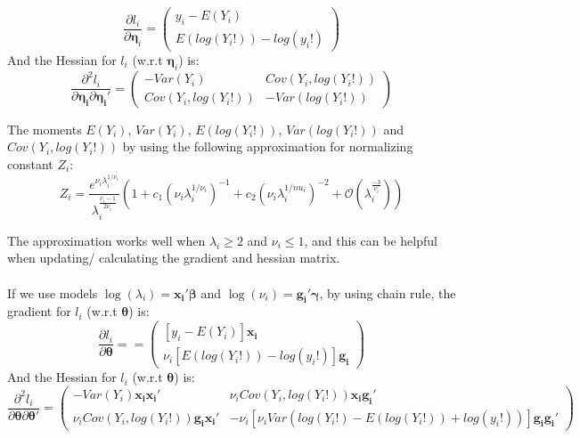 \documentclass[]{article}
\begin{document}
\begin{equation*}
	\frac{\partial l_i}{\partial \boldsymbol{\eta}_i} = 
	\begin{pmatrix} y_i - E(Y_i)\\
		E(log(Y_i!)) - log(y_i!)
	\end{pmatrix}
\end{equation*}
And the Hessian for $l_i$ (w.r.t $\boldsymbol{\eta}_i$) is:
\begin{equation*}
	\frac{\partial^2 l_i}{\partial \boldsymbol{\eta_i}\partial \boldsymbol{\eta_i}'}= 
	\begin{pmatrix} -Var(Y_i) & Cov(Y_i, log(Y_i!))\\
		Cov(Y_i, log(Y_i!)) & -Var(log(Y_i!))
	\end{pmatrix}
\end{equation*}

The moments $E(Y_i)$, $Var(Y_i)$, $E(log(Y_i!))$, $Var(log(Y_i!))$ and $Cov(Y_i, log(Y_i!))$ by using the following approximation for normalizing constant $Z_i$:
\begin{equation*}
	Z_i = \frac{e^{\nu_i \lambda_i^{1/\nu_i}}}{\lambda_i^{\frac{\nu_i-1}{2\nu_i}}}\left(1 + c_1(\nu_i \lambda_i^{1/\nu_i})^{-1} + c_2(\nu_i \lambda_i^{1/nu_i})^{-2} + \mathcal{O}(\lambda_i^{\frac{-3}{\nu_i}})\right)
\end{equation*}

The approximation works well when $\lambda_i \geq 2$ and $\nu_i \leq 1$, and this can be helpful when updating/ calculating the gradient and hessian matrix.\\
\\
If we use models $\log(\lambda_i) = \boldsymbol{x_i}'\boldsymbol{\beta}$ and $\log(\nu_i) = \boldsymbol{g_i}'\boldsymbol{\gamma}$, by using chain rule, the gradient for $l_i$ (w.r.t $\boldsymbol{\theta}$) is:
\begin{equation*}
	\frac{\partial l_i}{\partial \boldsymbol{\theta}} = 
	 = \begin{pmatrix} [y_i - E(Y_i)]\boldsymbol{x_i}\\
		\nu_i[E(log(Y_i!)) - log(y_i!)]\boldsymbol{g_i}
	\end{pmatrix}
\end{equation*}
And the Hessian for $l_i$ (w.r.t $\boldsymbol{\theta}$) is:
\begin{equation*}
	\frac{\partial^2 l_i}{\partial \boldsymbol{\theta}\partial \boldsymbol{\theta}'} = 
	\begin{pmatrix} -Var(Y_i)\boldsymbol{x_i}\boldsymbol{x_i}' &
		 \nu_i Cov(Y_i, log(Y_i!))\boldsymbol{x_i}\boldsymbol{g_i}'\\
		\nu_i Cov(Y_i, log(Y_i!))\boldsymbol{g_i}\boldsymbol{x_i}' &
		 -\nu_i[\nu_i Var(log(Y_i!) - E(log(Y_i!)) + log(y_i!))]\boldsymbol{g_i}\boldsymbol{g_i}'
	\end{pmatrix}
\end{equation*}
\end{document}
